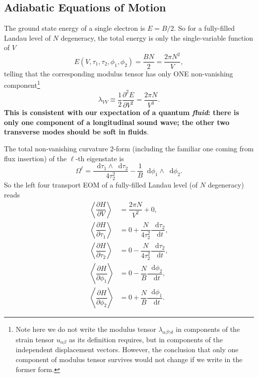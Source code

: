 \documentclass[10pt,nofootinbib,letterpaper]{revtex4}
\newcommand*\dd{\mathop{}\!\mathrm{d}}
\newcounter{Note}[section]
\begin{document}
	\subsection{Adiabatic Equations of Motion}
		The ground state energy of a single electron is $E=B/2$. So for a fully-filled Landau level of $N$ degeneracy, the total energy is only the single-variable function of $V$
		\begin{equation}\label{3.1.1}
			E(V,\tau_1,\tau_2,\phi_1,\phi_2)=\dfrac{BN}{2}=\dfrac{2\pi N^2}{V},
		\end{equation}
		telling that the corresponding modulus tensor has only ONE non-vanishing component\footnote{Note here we do not write the modulus tensor $\lambda_{\alpha\beta\gamma\delta}$ in components of the strain tensor $u_{\alpha\beta}$ as its definition requires, but in components of the independent displacement vectors. However, the conclusion that only one component of modulus tensor survives would not change if we write in the former form.}
		\begin{equation}\label{3.1.2}
			\lambda_{VV}\equiv\dfrac{1}{2}\dfrac{\partial^2 E}{\partial V^2}=\dfrac{2\pi N}{V^3}.
		\end{equation}
		\textbf{\color{red}This is consistent with our expectation of a quantum \emph{fluid}: there is only one component of a longitudinal sound wave; the other two transverse modes should be soft in fluids}.\par
		The total non-vanishing curvature $2$-form (including the familiar one coming from flux insertion) of the $\ell$-th eigenstate is
		\begin{equation}\label{3.1.3}
			\Omega^\ell=\dfrac{\dd\tau_1\wedge\dd\tau_2}{4\tau_2^2}-\dfrac{1}{B}\dd\phi_1\wedge\dd\phi_2.
		\end{equation}
		So the left four transport EOM of a fully-filled Landau level (of $N$ degeneracy) reads
		\begin{align*}
			\left\langle \dfrac{\partial H}{\partial V}\right\rangle&=\dfrac{2\pi N}{V^2}+0,\\
			\left\langle \dfrac{\partial H}{\partial \tau_1}\right\rangle&=0+\dfrac{N}{4\tau_2^2}\dfrac{\dd\tau_2}{\dd t},\\
			\left\langle \dfrac{\partial H}{\partial \tau_2}\right\rangle&=0-\dfrac{N}{4\tau_2^2}\dfrac{\dd\tau_2}{\dd t},\\
			\left\langle \dfrac{\partial H}{\partial \phi_1}\right\rangle&=0-\dfrac{N}{B}\dfrac{\dd\phi_2}{\dd t},\\
			\left\langle \dfrac{\partial H}{\partial \phi_2}\right\rangle&=0+\dfrac{N}{B}\dfrac{\dd\phi_1}{\dd t}.
		\end{align*}
\end{document}
